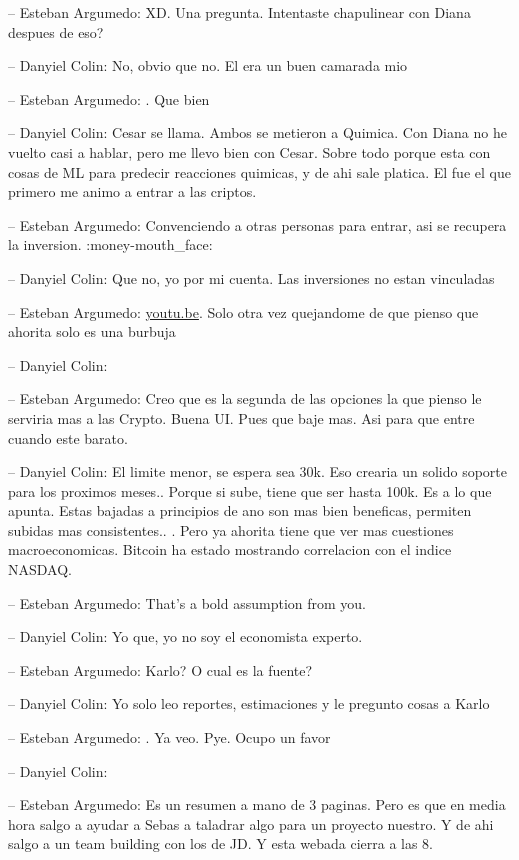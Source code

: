 -- Esteban Argumedo: XD. Una pregunta. Intentaste chapulinear con Diana
despues de eso?

-- Danyiel Colin: No, obvio que no. El era un buen camarada mio

-- Esteban Argumedo: . Que bien

-- Danyiel Colin: Cesar se llama. Ambos se metieron a Quimica. Con Diana
no he vuelto casi a hablar, pero me llevo bien con Cesar. Sobre todo
porque esta con cosas de ML para predecir reacciones quimicas, y de ahi
sale platica. El fue el que primero me animo a entrar a las criptos.

-- Esteban Argumedo: Convenciendo a otras personas para entrar, asi se
recupera la inversion. :money-mouth\_face:

-- Danyiel Colin: Que no, yo por mi cuenta. Las inversiones no estan
vinculadas

-- Esteban Argumedo: \href{https://youtu.be/chvoPa7kBG0}{youtu.be}. Solo
otra vez quejandome de que pienso que ahorita solo es una burbuja

-- Danyiel Colin:

-- Esteban Argumedo: Creo que es la segunda de las opciones la que
pienso le serviria mas a las Crypto. Buena UI. Pues que baje mas. Asi
para que entre cuando este barato.

-- Danyiel Colin: El limite menor, se espera sea 30k. Eso crearia un
solido soporte para los proximos meses.. Porque si sube, tiene que ser
hasta 100k. Es a lo que apunta. Estas bajadas a principios de ano son
mas bien beneficas, permiten subidas mas consistentes.. . Pero ya
ahorita tiene que ver mas cuestiones macroeconomicas. Bitcoin ha estado
mostrando correlacion con el indice NASDAQ.

-- Esteban Argumedo: That's a bold assumption from you.

-- Danyiel Colin: Yo que, yo no soy el economista experto.

-- Esteban Argumedo: Karlo? O cual es la fuente?

-- Danyiel Colin: Yo solo leo reportes, estimaciones y le pregunto cosas
a Karlo

-- Esteban Argumedo: . Ya veo. Pye. Ocupo un favor

-- Danyiel Colin:

-- Esteban Argumedo: Es un resumen a mano de 3 paginas. Pero es que en
media hora salgo a ayudar a Sebas a taladrar algo para un proyecto
nuestro. Y de ahi salgo a un team building con los de JD. Y esta webada
cierra a las 8.

